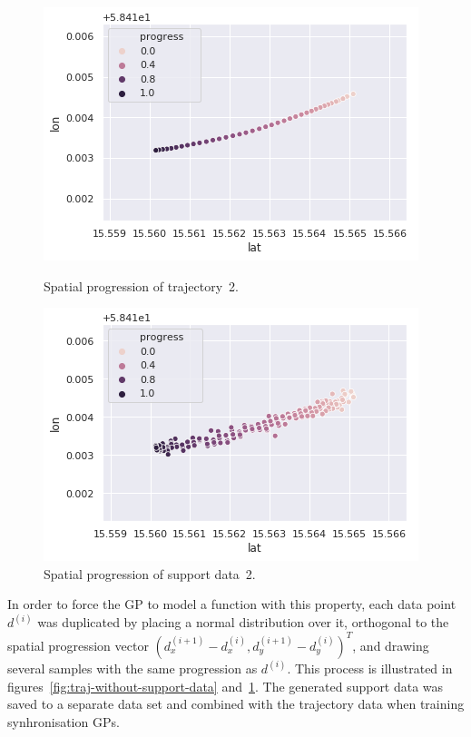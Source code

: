 \begin{figure}[H]
  \begin{minipage}{.46\textwidth}
    \includegraphics[scale=0.48,width=\textwidth]{figures/traj-without-support-data2.png}
    \caption{Spatial progression of trajectory~2.}
    \label{fig:traj-without-support-data}
  \end{minipage}
  \hspace{5pt}
  \begin{minipage}{.46\textwidth}
    \includegraphics[scale=0.5,width=\textwidth]{figures/traj-with-support-data2.png}
    \caption{Spatial progression of support data~2.}
    \label{fig:traj-with-support-data}
  \end{minipage}
\end{figure}

\noindent
In order to force the GP to model a function with this property, each data point $d^{(i)}$ was duplicated by placing a normal distribution over it, orthogonal to the spatial progression vector ${(d^{(i+1)}_x - d^{(i)}_x, d^{(i+1)}_y - d^{(i)}_y)}^T$, and drawing several samples with the same progression as $d^{(i)}$. This process is illustrated in figures~\ref{fig:traj-without-support-data} and~\ref{fig:traj-with-support-data}. The generated support data was saved to a separate data set and combined with the trajectory data when training synhronisation GPs.

